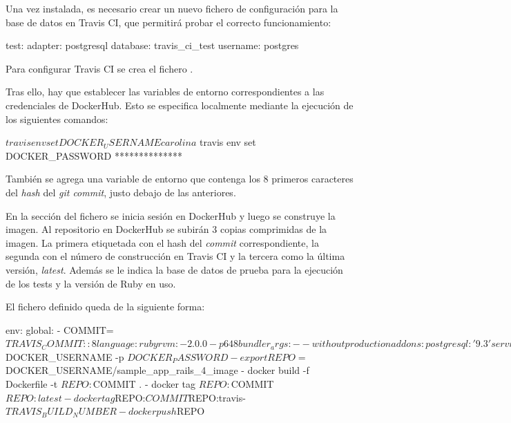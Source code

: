Una vez instalada, es necesario crear un nuevo fichero de configuración para la base de datos en Travis CI, que permitirá probar el correcto funcionamiento:
\begin{codelisting}
\label{code:travisdatabase}
\begin{code}
test:
  adapter: postgresql
  database: travis_ci_test
  username: postgres
\end{code}
\end{codelisting}

Para configurar Travis CI se crea el fichero . 


Tras ello, hay que establecer las variables de entorno correspondientes a las credenciales de DockerHub. Esto se especifica localmente mediante la ejecución de los siguientes comandos:

\begin{code}
$ travis env set DOCKER_USERNAME carolina
$ travis env set DOCKER_PASSWORD **************
\end{code}

También se agrega una variable de entorno que contenga los 8 primeros caracteres del \textit{hash} del \textit{git commit}, justo debajo de las anteriores.

En la sección  del fichero se inicia sesión en DockerHub y luego se construye la imagen. Al repositorio en DockerHub se subirán 3 copias comprimidas de la imagen. La primera etiquetada con el hash del \textit{commit} correspondiente, la segunda con el número de construcción en Travis CI y la tercera como la última versión, \textit{latest}. Además se le indica la base de datos de prueba para la ejecución de los tests y la versión de Ruby en uso.

El fichero definido queda de la siguiente forma:

\begin{codelisting}
\label{code:travis}
\begin{code}
env:
  global:
  - COMMIT=${TRAVIS_COMMIT::8}
language: ruby
rvm:
- 2.0.0-p648
bundler_args: --without production
addons:
  postgresql: '9.3'
services:
- docker
before_script:
- cp config/database.yml.travis config/database.yml
- psql -c 'create database travis_ci_test;' -U postgres
- RAILS_ENV=test bundle exec rake db:migrate --trace
script:
- bundle exec rspec
notifications:
  email:
    recipients:
    - c.santanamartel@gmail.com
    on_success: always
    on_failure: always
sudo: required
after_success:
- docker login -u $DOCKER_USERNAME -p $DOCKER_PASSWORD
- export REPO=$DOCKER_USERNAME/sample_app_rails_4_image
- docker build -f Dockerfile -t $REPO:$COMMIT .
- docker tag $REPO:$COMMIT $REPO:latest
- docker tag $REPO:$COMMIT $REPO:travis-$TRAVIS_BUILD_NUMBER
- docker push $REPO  
\end{code}
\end{codelisting}

